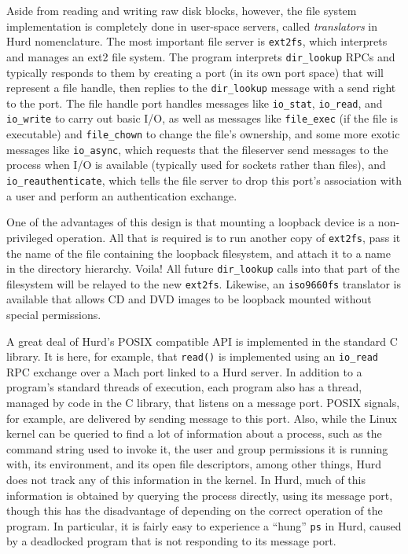 \documentclass{article}
\begin{document}
Aside from reading and writing raw disk blocks, however, the file
system implementation is completely done in user-space servers, called
{\it translators} in Hurd nomenclature.  The most important file
server is {\tt ext2fs}, which interprets and manages an ext2 file
system.  The program interprets {\tt dir_lookup} RPCs and typically
responds to them by creating a port (in its own port space) that will
represent a file handle, then replies to the {\tt dir_lookup} message
with a send right to the port.  The file handle port handles messages
like {\tt io_stat}, {\tt io_read}, and {\tt io_write} to carry out
basic I/O, as well as messages like {\tt file_exec} (if the file is
executable) and {\tt file_chown} to change the file's ownership, and
some more exotic messages like {\tt io_async}, which requests that the
fileserver send messages to the process when I/O is available
(typically used for sockets rather than files), and {\tt
  io_reauthenticate}, which tells the file server to drop this port's
association with a user and perform an authentication exchange.

One of the advantages of this design is that mounting a loopback
device is a non-privileged operation.  All that is required is to run
another copy of {\tt ext2fs}, pass it the name of the file containing
the loopback filesystem, and attach it to a name in the directory
hierarchy.  Voila!  All future {\tt dir_lookup} calls into that part
of the filesystem will be relayed to the new {\tt ext2fs}.  Likewise,
an {\tt iso9660fs} translator is available that allows CD and DVD
images to be loopback mounted without special permissions.

A great deal of Hurd's POSIX compatible API is implemented in the
standard C library.  It is here, for example, that {\tt read()} is
implemented using an {\tt io_read} RPC exchange over a Mach port
linked to a Hurd server.  In addition to a program's standard threads
of execution, each program also has a thread, managed by code in the C
library, that listens on a message port.  POSIX signals, for example,
are delivered by sending message to this port.  Also, while the Linux
kernel can be queried to find a lot of information about a process,
such as the command string used to invoke it, the user and group
permissions it is running with, its environment, and its open file
descriptors, among other things, Hurd does not track any of this
information in the kernel.  In Hurd, much of this information is
obtained by querying the process directly, using its message port,
though this has the disadvantage of depending on the correct operation
of the program.  In particular, it is fairly easy to experience a
``hung'' {\tt ps} in Hurd, caused by a deadlocked program that is not
responding to its message port.
\end{document}
